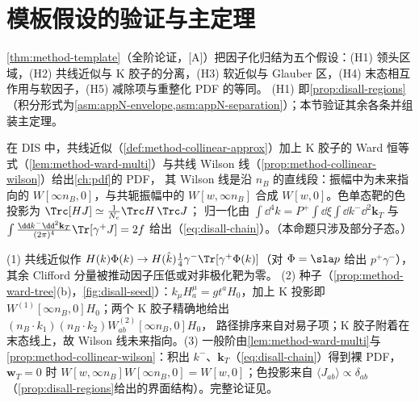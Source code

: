 \section{模板假设的验证与主定理}\label{sec:disall-theorem}

\cref{thm:method-template}（全阶论证，[A]）把因子化归结为五个假设：(H1) 领头区域，(H2) 共线近似与 K 胶子的分离，(H3) 软近似与 Glauber 区，(H4) 末态相互作用与软因子，(H5) 减除项与重整化 PDF 的等同。
(H1) 即\cref{prop:disall-regions}（积分形式为\cref{asm:appN-envelope,asm:appN-separation}）；本节验证其余各条并组装主定理。

\begin{proposition}\label{prop:disall-h2}
在 DIS 中，共线近似（\cref{def:method-collinear-approx}）加上 K 胶子的 Ward 恒等式（\cref{lem:method-ward-multi}）与共线 Wilson 线（\cref{prop:method-collinear-wilson}）给出\cref{ch:pdf}的 PDF，
其 Wilson 线是沿 $n_B$ 的直线段：振幅中为未来指向的 $W[\infty n_B,0]$，与共轭振幅中的 $W[w,\infty n_B]$ 合成 $W[w,0]$。色单态靶的色投影为 $\Trc[HJ]\simeq\frac1{N_c}\Trc H\,\Trc J$；
归一化由 $\int\dd^4k=P^+\!\int\dd\xi\int\dd k^-\dd^2\mathbf k_T$ 与 $\int\frac{\dd k^-\dd^2\mathbf k_T}{(2\pi)^4}\Tr[\gamma^+J]=2f$ 给出（\cref{eq:disall-chain}）。（本命题只涉及部分子态。）
\end{proposition}

\begin{proofsketch}
(1) 共线近似作 $H(k)\Phi(k)\to H(\hat k)\frac14\gamma^-\Tr[\gamma^+\Phi(k)]$（对 $\Phi=\sla p$ 给出 $p^+\gamma^-$），其余 Clifford 分量被推动因子压低或对非极化靶为零。
(2) 种子（\cref{prop:method-ward-tree}(b)，\cref{fig:disall-seed}）：$k_\mu H^\mu_a=gt^aH_0$，加上 K 投影即 $W^{(1)}[\infty n_B,0]H_0$；两个 K 胶子精确地给出 $(n_B\cdot k_1)(n_B\cdot k_2)W^{(2)}_{ab}[\infty n_B,0]H_0$，
路径排序来自对易子项；K 胶子附着在末态线上，故 Wilson 线未来指向。(3) 一般阶由\cref{lem:method-ward-multi}与\cref{prop:method-collinear-wilson}：积出 $k^-$、$\mathbf k_T$（\cref{eq:disall-chain}）得到裸 PDF，
$\mathbf w_T=0$ 时 $W[w,\infty n_B]W[\infty n_B,0]=W[w,0]$；色投影来自 $\langle J_{ab}\rangle\propto\delta_{ab}$（\cref{prop:disall-regions}给出的界面结构）。完整论证见\cite[第~11.3、11.9~节]{Collins2011}。
\end{proofsketch}

